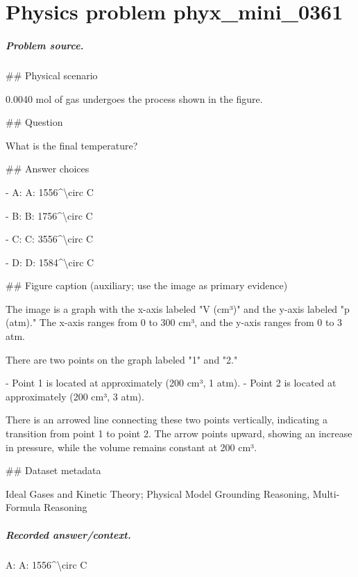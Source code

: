 
\chapter{Physics problem phyx\_mini\_0361}
\label{ch:PhyXMiniProblems_problem_phyx_mini_0361}

\paragraph{Problem source.}
\#\# Physical scenario

0.0040 mol of gas undergoes the process shown in the figure.

\#\# Question

What is the final temperature?

\#\# Answer choices

- A: A: 1556\textasciicircum{}\textbackslash{}circ C

- B: B: 1756\textasciicircum{}\textbackslash{}circ C

- C: C: 3556\textasciicircum{}\textbackslash{}circ C

- D: D: 1584\textasciicircum{}\textbackslash{}circ C

\#\# Figure caption (auxiliary; use the image as primary evidence)

The image is a graph with the x-axis labeled "V (cm³)" and the y-axis labeled "p (atm)." The x-axis ranges from 0 to 300 cm³, and the y-axis ranges from 0 to 3 atm.

There are two points on the graph labeled "1" and "2." 

- Point 1 is located at approximately (200 cm³, 1 atm).
- Point 2 is located at approximately (200 cm³, 3 atm).

There is an arrowed line connecting these two points vertically, indicating a transition from point 1 to point 2. The arrow points upward, showing an increase in pressure, while the volume remains constant at 200 cm³.

\#\# Dataset metadata

Ideal Gases and Kinetic Theory; Physical Model Grounding Reasoning, Multi-Formula Reasoning

\paragraph{Recorded answer/context.}
A: A: 1556\textasciicircum{}\textbackslash{}circ C

